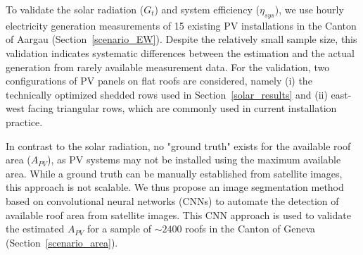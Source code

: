 To validate the solar radiation ($G_t$) and system efficiency ($\eta_\mathit{sys}$), we use hourly electricity generation measurements of 15 existing PV installations in the Canton of Aargau (Section~\ref{scenario_EW}).
Despite the relatively small sample size, this validation indicates systematic differences between the estimation and the actual generation from rarely available measurement data. 
For the validation, two configurations of PV panels on flat roofs are considered, namely (i) the technically optimized shedded rows used in Section~\ref{solar_results} and (ii) east-west facing triangular rows, which are commonly used in current installation practice.


In contrast to the solar radiation, no "ground truth" exists for the available roof area ($A_{PV}$), as PV systems may not be installed using the maximum available area.
While a ground truth can be manually established from satellite images, this approach is not scalable.
We thus propose an image segmentation method based on convolutional neural networks (CNNs) to automate the detection of available roof area from satellite images. This CNN approach is used to validate the estimated $A_{PV}$ for a sample of $\sim 2400$ roofs in the Canton of Geneva (Section~\ref{scenario_area}).


